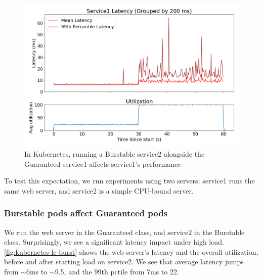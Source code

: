 \begin{figure}[t]
    \centering
    \includegraphics[width=\columnwidth]{graphs/kubernetes-lc-burst.png}
    \caption{In Kubernetes, running a Burstable service2 alongside the Guaranteed
    service1 affects service1's performance}\label{fig:kubernetes-lc-burst}
\end{figure}

To test this expectation, we run experiments using two servers: service1 runs
the same web server, and service2 is a simple CPU-bound server. 

\subsubsection{Burstable pods affect Guaranteed pods}

We run the web server in the Guaranteed class, and service2 in the Burstable
class. Surprisingly, we see a significant latency impact under high load.
\autoref{fig:kubernetes-lc-burst} shows the web server's latency and the overall
utilization, before and after starting load on service2. We see that average
latency jumps from $\sim$6ms to $\sim$9.5, and the 99th pctile from 7ms to 22.

